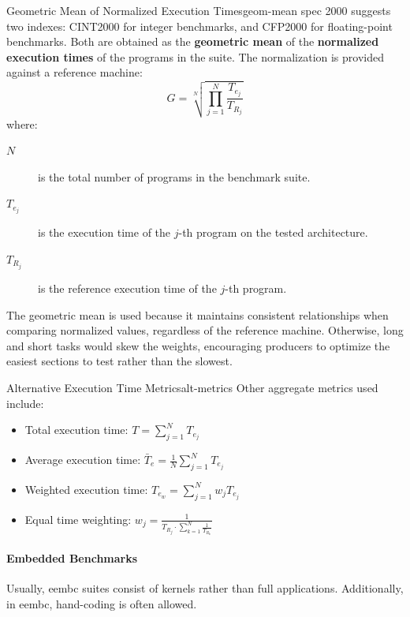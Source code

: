 \begin{definition}{Geometric Mean of Normalized Execution Times}{geom-mean}
    \gls{spec} 2000 suggests two indexes: CINT2000 for integer benchmarks, and CFP2000 for floating-point benchmarks. Both are obtained as the \textbf{geometric mean} of the \textbf{normalized execution times} of the programs in the suite. The normalization is provided against a reference machine:
    \[
        G = \sqrt[N]{\prod_{j=1}^N \frac{T_{e_j}}{T_{R_j}}}
    \]
    where:
    \begin{description}
        \item[\(N\)] is the total number of programs in the benchmark suite.
        \item[\(T_{e_j}\)] is the execution time of the \(j\)-th program on the tested architecture.
        \item[\({T_{R_j}}\)] is the reference execution time of the \(j\)-th program.
    \end{description}
    The geometric mean is used because it maintains consistent relationships when comparing normalized values, regardless of the reference machine. Otherwise, long and short tasks would skew the weights, encouraging producers to optimize the easiest sections to test rather than the slowest. 
\end{definition}

\begin{definition}{Alternative Execution Time Metrics}{alt-metrics}
    Other aggregate metrics used include:
    \begin{itemize}
        \item Total execution time: \(T = \sum_{j=1}^N T_{e_j}\)
        \item Average execution time: \(\bar{T}_e = \frac{1}{N} \sum_{j=1}^N T_{e_j}\)
        \item Weighted execution time: \(T_{e_w} = \sum_{j=1}^N w_j T_{e_j}\)
        \item Equal time weighting: \(w_j = \frac{1}{T_{R_j} \cdot \sum_{k=1}^N \frac{1}{T_{R_k}}}\)
    \end{itemize}
\end{definition}

\paragraph{Embedded Benchmarks} 
Usually, \gls{eembc} suites consist of kernels rather than full applications. Additionally, in \gls{eembc}, hand-coding is often allowed.

